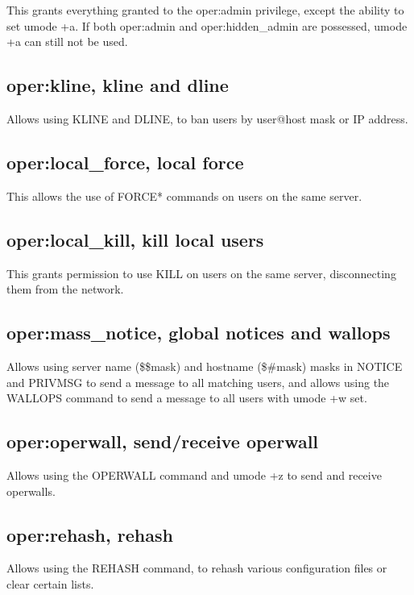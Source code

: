 	This grants everything granted to the oper:admin privilege, except the
	ability to set umode +a. If both oper:admin and	oper:hidden\_admin are
	possessed, umode +a can still not be used.


\subsection{oper:kline, kline and dline}

	Allows using KLINE and DLINE, to ban users by user@host mask
	or IP address.


\subsection{oper:local\_force, local force}

This allows the use of FORCE* commands on users on the same server.


\subsection{oper:local\_kill, kill local users}

	This grants permission to use KILL on users on the same server,
	disconnecting them from the network.


\subsection{oper:mass\_notice, global notices and wallops}

	Allows using server name (\$\$mask) and hostname (\$\#mask) masks in
	NOTICE and PRIVMSG to send a message to all matching users, and allows
	using the WALLOPS command to send a message to all users with umode +w
	set.


\subsection{oper:operwall, send/receive operwall}

	Allows using the OPERWALL command and umode +z to send and receive
	operwalls.


\subsection{oper:rehash, rehash}

	Allows using the REHASH command, to rehash various configuration files
	or clear certain lists.


